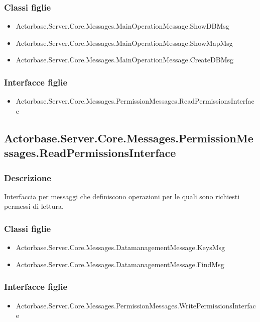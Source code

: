 \documentclass[a4paper]{article}
\begin{document}
			\subsubsection{Classi figlie}
			\begin{itemize}
				\item Actorbase.Server.Core.Messages.MainOperationMessage.ShowDBMsg
				\item Actorbase.Server.Core.Messages.MainOperationMessage.ShowMapMsg
				\item Actorbase.Server.Core.Messages.MainOperationMessage.CreateDBMsg
			\end{itemize}
			\subsubsection{Interfacce figlie}
			\begin{itemize}
				\item Actorbase.Server.Core.Messages.PermissionMessages.ReadPermissionsInterface
			\end{itemize}

			\subsection{Actorbase.Server.Core.Messages.PermissionMessages.ReadPermissionsInterface}
			\subsubsection{Descrizione}
				Interfaccia per messaggi che definiscono operazioni per le quali sono richiesti permessi di lettura.
			\subsubsection{Classi figlie}
			\begin{itemize}
				\item Actorbase.Server.Core.Messages.DatamanagementMessage.KeysMsg
				\item Actorbase.Server.Core.Messages.DatamanagementMessage.FindMsg
			\end{itemize}
			\subsubsection{Interfacce figlie}
			\begin{itemize}
				\item Actorbase.Server.Core.Messages.PermissionMessages.WritePermissionsInterface
			\end{itemize}
\end{document}
